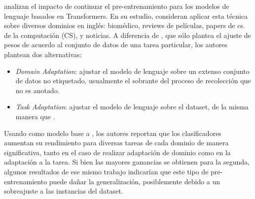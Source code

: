 \citet{gururangan-etal-2020-dont} analizan el impacto de continuar el pre-entrenamiento para los modelos de lenguaje basados en Transformers. En su estudio, consideran aplicar esta técnica sobre diversos dominios en inglés: biomédico, reviews de películas, papers de cs. de la computación (CS), y noticias. A diferencia de \ulmfit{}, que sólo plantea el ajuste de pesos de acuerdo al conjunto de datos de una tarea particular, los autores plantean dos alternativas:

\begin{itemize}
    \item \emph{Domain Adaptation}: ajustar el modelo de lenguaje sobre un extenso conjunto de datos no etiquetado, usualmente el sobrante del proceso de recolección que no es anotado.
    \item \emph{Task Adaptation}: ajustar el modelo de lenguaje sobre el dataset, de la misma manera que \citet{howard-ruder-2018-universal}.
\end{itemize}

Usando como modelo base a \roberta{}, los autores reportan que los clasificadores aumentan su rendimiento para diversas tareas de cada dominio de manera significativa, tanto en el caso de realizar adaptación de dominio como en la adaptación a la tarea. Si bien las mayores ganancias se obtienen para la segunda, algunos resultados de ese mismo trabajo indicarían que este tipo de pre-entrenamiento puede dañar la generalización, posiblemente debido a un sobreajuste a las instancias del dataset.

